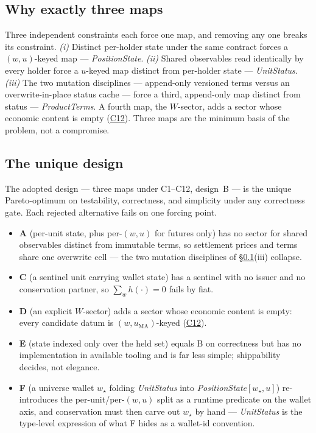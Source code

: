 \subsection{Why exactly three maps}
\label{sec:sec04-pareto-three}

Three independent constraints each force one map, and removing any one breaks its
constraint. \emph{(i)} Distinct per-holder state under the same contract forces a
$(w,u)$-keyed map --- \emph{PositionState}. \emph{(ii)} Shared observables read identically
by every holder force a $u$-keyed map distinct from per-holder state --- \emph{UnitStatus}.
\emph{(iii)} The two mutation disciplines --- append-only versioned terms versus an
overwrite-in-place status cache --- force a third, append-only map distinct from status ---
\emph{ProductTerms}. A fourth map, the $W$-sector, adds a sector whose economic content is
empty (\hyperref[cond:C12]{C12}). Three maps are the minimum basis of the problem, not a
compromise.

\subsection{The unique design}
\label{sec:sec04-pareto}

The adopted design --- three maps under C1--C12, design~B --- is the unique Pareto-optimum
on testability, correctness, and simplicity under any correctness gate. Each rejected
alternative fails on one forcing point.

\begin{itemize}[leftmargin=1.4em]
\item \textbf{A} (per-unit state, plus per-$(w,u)$ for futures only) has no sector for
shared observables distinct from immutable terms, so settlement prices and terms share one
overwrite cell --- the two mutation disciplines of \S\ref{sec:sec04-pareto-three}(iii)
collapse.
\item \textbf{C} (a sentinel unit carrying wallet state) has a sentinel with no issuer and
no conservation partner, so $\sum_{w}h(\cdot)=0$ fails by fiat.
\item \textbf{D} (an explicit $W$-sector) adds a sector whose economic content is empty:
every candidate datum is $(w,u_{\mathrm{MA}})$-keyed (\hyperref[cond:C12]{C12}).
\item \textbf{E} (state indexed only over the held set) equals B on correctness but has no
implementation in available tooling and is far less simple; shippability decides, not
elegance.
\item \textbf{F} (a universe wallet $w_\star$ folding \emph{UnitStatus} into
\emph{PositionState}$[w_\star,u]$) re-introduces the per-unit/per-$(w,u)$ split as a runtime
predicate on the wallet axis, and conservation must then carve out $w_\star$ by hand ---
\emph{UnitStatus} is the type-level expression of what F hides as a wallet-id convention.
\end{itemize}

